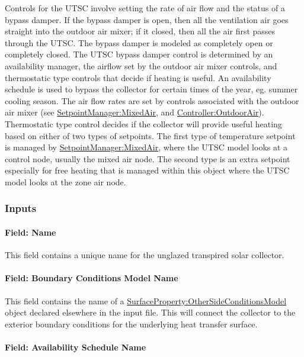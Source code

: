 Controls for the UTSC involve setting the rate of air flow and the status of a bypass damper. If the bypass damper is open, then all the ventilation air goes straight into the outdoor air mixer; if it closed, then all the air first passes through the UTSC. The bypass damper is modeled as completely open or completely closed. The UTSC bypass damper control is determined by an availability manager, the airflow set by the outdoor air mixer controls, and thermostatic type controls that decide if heating is useful. An availability schedule is used to bypass the collector for certain times of the year, eg. summer cooling season. The air flow rates are set by controls associated with the outdoor air mixer (see \hyperref[setpointmanagermixedair]{SetpointManager:MixedAir}, and \hyperref[controlleroutdoorair]{Controller:OutdoorAir}). Thermostatic type control decides if the collector will provide useful heating based on either of two types of setpoints. The first type of temperature setpoint is managed by \hyperref[setpointmanagermixedair]{SetpointManager:MixedAir}, where the UTSC model looks at a control node, usually the mixed air node. The second type is an extra setpoint especially for free heating that is managed within this object where the UTSC model looks at the zone air node.

\subsubsection{Inputs}\label{inputs-6-026}

\paragraph{Field: Name}\label{field-name-6-021}

This field contains a unique name for the unglazed transpired solar collector.

\paragraph{Field: Boundary Conditions Model Name}\label{field-boundary-conditions-model-name-000}

This field contains the name of a \hyperref[surfacepropertyothersideconditionsmodel]{SurfaceProperty:OtherSideConditionsModel} object declared elsewhere in the input file. This will connect the collector to the exterior boundary conditions for the underlying heat transfer surface.

\paragraph{Field: Availability Schedule Name}\label{field-availability-schedule-name-016}

